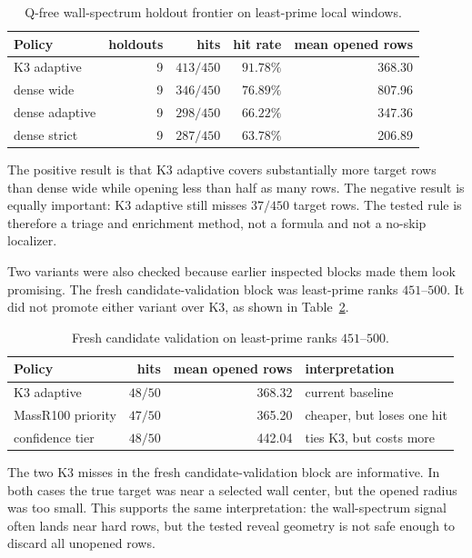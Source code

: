 \documentclass[11pt]{article}
\begin{document}
\begin{table}[!htbp]
\centering
\caption{Q-free wall-spectrum holdout frontier on least-prime local windows.}
\label{tab:wallfrontier}
\begin{tabular}{lrrrr}
\toprule
Policy & holdouts & hits & hit rate & mean opened rows \\
\midrule
K3 adaptive & 9 & \(413/450\) & \(91.78\%\) & 368.30 \\
dense wide & 9 & \(346/450\) & \(76.89\%\) & 807.96 \\
dense adaptive & 9 & \(298/450\) & \(66.22\%\) & 347.36 \\
dense strict & 9 & \(287/450\) & \(63.78\%\) & 206.89 \\
\bottomrule
\end{tabular}
\end{table}

The positive result is that K3 adaptive covers substantially more target rows
than dense wide while opening less than half as many rows. The negative result
is equally important: K3 adaptive still misses \(37/450\) target rows. The
tested rule is therefore a triage and enrichment method, not a formula and not
a no-skip localizer.

Two variants were also checked because earlier inspected blocks made them look
promising. The fresh candidate-validation block was least-prime ranks
\(451\)--\(500\). It did not promote either variant over K3, as shown in
Table~\ref{tab:wallcandidates}.

\begin{table}[!htbp]
\centering
\caption{Fresh candidate validation on least-prime ranks \(451\)--\(500\).}
\label{tab:wallcandidates}
\begin{tabular}{lrrl}
\toprule
Policy & hits & mean opened rows & interpretation \\
\midrule
K3 adaptive & \(48/50\) & 368.32 & current baseline \\
MassR100 priority & \(47/50\) & 365.20 & cheaper, but loses one hit \\
confidence tier & \(48/50\) & 442.04 & ties K3, but costs more \\
\bottomrule
\end{tabular}
\end{table}

The two K3 misses in the fresh candidate-validation block are informative.
In both cases the true target was near a selected wall center, but the opened
radius was too small. This supports the same interpretation: the wall-spectrum
signal often lands near hard rows, but the tested reveal geometry is not safe
enough to discard all unopened rows.
\end{document}
